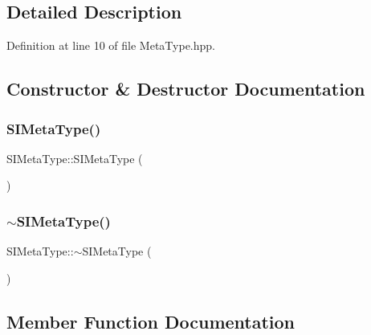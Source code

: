 \subsection{Detailed Description}


Definition at line 10 of file Meta\+Type.\+hpp.



\subsection{Constructor \& Destructor Documentation}
\mbox{\label{class_s_i_meta_type_a0cc60018de6ef6070c9a01b1e9ca23f2}} 
\subsubsection{\texorpdfstring{SIMetaType()}{SIMetaType()}}
{\footnotesize\ttfamily S\+I\+Meta\+Type\+::\+S\+I\+Meta\+Type (\begin{DoxyParamCaption}{ }\end{DoxyParamCaption})\hspace{0.3cm}{\ttfamily [default]}}

\mbox{\label{class_s_i_meta_type_ab6fdafe819117b3bebc7a302cd4c0cea}} 
\subsubsection{\texorpdfstring{$\sim$SIMetaType()}{~SIMetaType()}}
{\footnotesize\ttfamily S\+I\+Meta\+Type\+::$\sim$\+S\+I\+Meta\+Type (\begin{DoxyParamCaption}{ }\end{DoxyParamCaption})\hspace{0.3cm}{\ttfamily [default]}}



\subsection{Member Function Documentation}
\mbox{\label{class_s_i_meta_type_a11a0163d4739f1e9c5ced44fb8a9dcbc}} 
